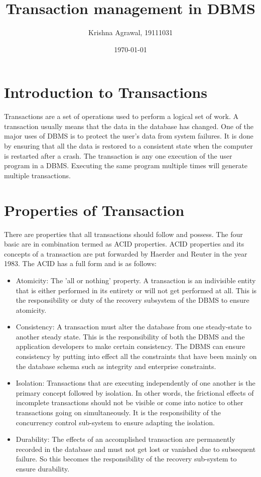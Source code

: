 \documentclass{article}
\title{Transaction management in DBMS}
\author{Krishna Agrawal, 19111031}
\date{\today}
\begin{document}
\maketitle


\section{Introduction to Transactions}

Transactions are a set of operations used to perform a logical set of work. A transaction usually means that the data in the database has changed. One of the major uses of DBMS is to protect the user’s data from system failures. It is done by ensuring that all the data is restored to a consistent state when the computer is restarted after a crash. The transaction is any one execution of the user program in a DBMS. Executing the same program multiple times will generate multiple transactions.



\section{Properties of Transaction}

There are properties that all transactions should follow and possess. The four basic are in combination termed as ACID properties. ACID properties and its concepts of a transaction are put forwarded by Haerder and Reuter in the year 1983. The ACID has a full form and is as follows:

\begin{itemize}

\item Atomicity: The 'all or nothing' property. A transaction is an indivisible entity that is either performed in its entirety or will not get performed at all. This is the responsibility or duty of the recovery subsystem of the DBMS to ensure atomicity.

\item Consistency: A transaction must alter the database from one steady-state to another steady state. This is the responsibility of both the DBMS and the application developers to make certain consistency. The DBMS can ensure consistency by putting into effect all the constraints that have been mainly on the database schema such as integrity and enterprise constraints.

\item Isolation: Transactions that are executing independently of one another is the primary concept followed by isolation. In other words, the frictional effects of incomplete transactions should not be visible or come into notice to other transactions going on simultaneously. It is the responsibility of the concurrency control sub-system to ensure adapting the isolation.

\item Durability: The effects of an accomplished transaction are permanently recorded in the database and must not get lost or vanished due to subsequent failure. So this becomes the responsibility of the recovery sub-system to ensure durability.

 \end{itemize}
\end{document}
